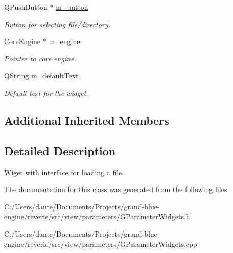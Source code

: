\begin{Indent}
\begin{DoxyCompactItemize}
\item 
\mbox{\label{classrev_1_1_view_1_1_file_load_widget_a51e11c68f105baafa41b2cf0b0953add}} 
Q\+Push\+Button $\ast$ \mbox{\hyperlink{classrev_1_1_view_1_1_file_load_widget_a51e11c68f105baafa41b2cf0b0953add}{m\+\_\+button}}
\begin{DoxyCompactList}\small\item\em Button for selecting file/directory. \end{DoxyCompactList}\item 
\mbox{\label{classrev_1_1_view_1_1_file_load_widget_a01f948e3e23e1c0ba19e20a011f3839b}} 
\mbox{\hyperlink{classrev_1_1_core_engine}{Core\+Engine}} $\ast$ \mbox{\hyperlink{classrev_1_1_view_1_1_file_load_widget_a01f948e3e23e1c0ba19e20a011f3839b}{m\+\_\+engine}}
\begin{DoxyCompactList}\small\item\em Pointer to core engine. \end{DoxyCompactList}\item 
\mbox{\label{classrev_1_1_view_1_1_file_load_widget_a87d908a0084c937935d515255779263b}} 
Q\+String \mbox{\hyperlink{classrev_1_1_view_1_1_file_load_widget_a87d908a0084c937935d515255779263b}{m\+\_\+default\+Text}}
\begin{DoxyCompactList}\small\item\em Default text for the widget. \end{DoxyCompactList}\end{DoxyCompactItemize}
\end{Indent}
\subsection*{Additional Inherited Members}


\subsection{Detailed Description}
Wiget with interface for loading a file. 

The documentation for this class was generated from the following files\+:\begin{DoxyCompactItemize}
\item 
C\+:/\+Users/dante/\+Documents/\+Projects/grand-\/blue-\/engine/reverie/src/view/parameters/G\+Parameter\+Widgets.\+h\item 
C\+:/\+Users/dante/\+Documents/\+Projects/grand-\/blue-\/engine/reverie/src/view/parameters/G\+Parameter\+Widgets.\+cpp\end{DoxyCompactItemize}
